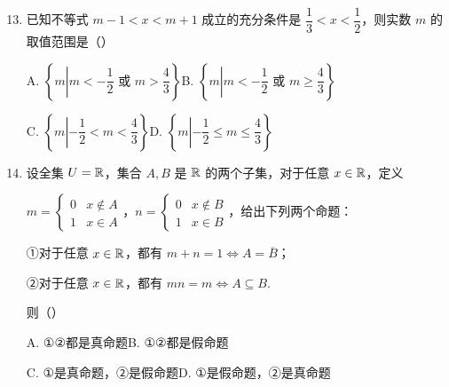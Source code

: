\documentclass[a4paper,11pt]{article}
\begin{document}

\begin{enumerate}
\setcounter{enumi}{12}

\item 已知不等式 $m-1<x<m+1$ 成立的充分条件是 $\dfrac13<x<\dfrac12$，则实数 $m$ 的取值范围是\mbox{（\quad）}

\keepwithprev
A. $\left\{m\left|m<-\dfrac12\text{ 或 }m>\dfrac43\right.\right\}$\qquad B. $\left\{m\left|m<-\dfrac12\text{ 或 }m\geqslant\dfrac43\right.\right\}$

C. $\left\{m\left|-\dfrac12<m<\dfrac43\right.\right\}$\qquad D. $\left\{m\left|-\dfrac12\leqslant m\leqslant\dfrac43\right.\right\}$


\ifanswer
\solbegin
{}
\solend

\fi

\item 设全集 $U=\mathbb{R}$，集合 $A,B$ 是 $\mathbb{R}$ 的两个子集，对于任意 $x\in\mathbb{R}$，定义

$m=\begin{cases}0&x\notin A\\ 1&x\in A\end{cases}$，$n=\begin{cases}0&x\notin B\\ 1&x\in B\end{cases}$，给出下列两个命题：

①对于任意 $x\in\mathbb{R}$，都有 $m+n=1\Leftrightarrow A=\overline{B}$；

②对于任意 $x\in\mathbb{R}$，都有 $mn=m\Leftrightarrow A\subseteq B$.

则\mbox{（\quad）}

\keepwithprev
A. ①②都是真命题\qquad B. ①②都是假命题

C. ①是真命题，②是假命题\qquad D. ①是假命题，②是真命题



\end{enumerate}
\end{document}
